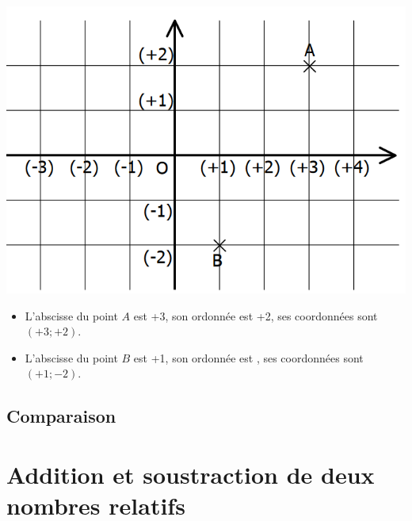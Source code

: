 \documentclass[xcolor={dvipsnames}]{beamer}
\begin{document}
\begin{frame}
	\begin{myex}
		\begin{center}
			\includegraphics[scale=0.4]{repere}
		\end{center}
		
		
		\begin{itemize}
			\item L'abscisse du point $A$ est \pause +3, son ordonnée est \pause +2, ses coordonnées sont \pause $(+3; +2)$. \pause
				
			\item L'abscisse du point $B$ est \pause +1, son ordonnée est , ses coordonnées sont \pause  $(+1; -2)$.
		
		\end{itemize}
	\end{myex}
\end{frame}

\subsection{Comparaison}

\section{Addition et soustraction de deux nombres relatifs}
\end{document}
